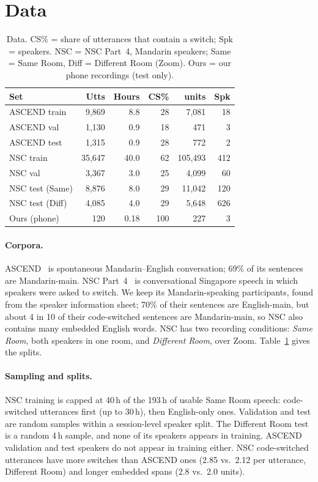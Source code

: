 \section{Data}
\label{sec:data}

\begin{table}[t]
\centering
\small
\setlength{\tabcolsep}{2.4pt}
\begin{tabular}{lrrrrr}
\toprule
Set & Utts & Hours & CS\% & \Emb{} units & Spk \\
\midrule
ASCEND train & 9{,}869 & 8.8 & 28 & 7{,}081 & 18 \\
ASCEND val & 1{,}130 & 0.9 & 18 & 471 & 3 \\
ASCEND test & 1{,}315 & 0.9 & 28 & 772 & 2 \\
NSC train & 35{,}647 & 40.0 & 62 & 105{,}493 & 412 \\
NSC val & 3{,}367 & 3.0 & 25 & 4{,}099 & 60 \\
NSC test (Same) & 8{,}876 & 8.0 & 29 & 11{,}042 & 120 \\
NSC test (Diff) & 4{,}085 & 4.0 & 29 & 5{,}648 & 626 \\
Ours (phone) & 120 & 0.18 & 100 & 227 & 3 \\
\bottomrule
\end{tabular}
\caption{Data. CS\% = share of utterances that contain a switch; Spk = speakers. NSC = NSC Part~4, Mandarin speakers; Same = Same Room, Diff = Different Room (Zoom). Ours = our phone recordings (test only).}
\label{tab:data}
\end{table}

\paragraph{Corpora.}
ASCEND~\citep{lovenia2022ascend} is spontaneous Mandarin--English conversation; 69\% of its sentences are Mandarin-main. NSC Part~4~\citep{koh2019nsc} is conversational Singapore speech in which speakers were asked to switch. We keep its Mandarin-speaking participants, found from the speaker information sheet; 70\% of their sentences are English-main, but about 4 in 10 of their code-switched sentences are Mandarin-main, so NSC also contains many embedded English words. NSC has two recording conditions: \emph{Same Room}, both speakers in one room, and \emph{Different Room}, over Zoom. Table~\ref{tab:data} gives the splits.

\paragraph{Sampling and splits.}
NSC training is capped at 40\,h of the 193\,h of usable Same Room speech: code-switched utterances first (up to 30\,h), then English-only ones. Validation and test are random samples within a session-level speaker split. The Different Room test is a random 4\,h sample, and none of its speakers appears in training. ASCEND validation and test speakers do not appear in training either. NSC code-switched utterances have more switches than ASCEND ones (2.85 vs.\ 2.12 per utterance, Different Room) and longer embedded spans (2.8 vs.\ 2.0 units).

